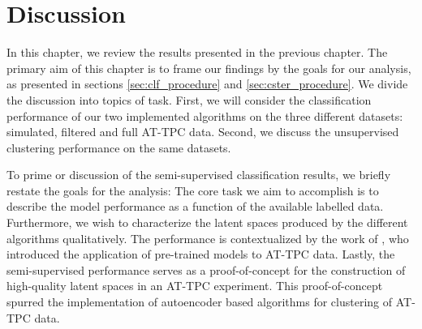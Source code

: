\chapter{Discussion}
In this chapter, we review the results presented in the previous chapter. The primary aim of this chapter is to frame our findings by the goals for our analysis, as presented in sections \ref{sec:clf_procedure} and \ref{sec:cster_procedure}. We divide the discussion into topics of task. First, we will consider the classification performance of our two implemented algorithms on the three different datasets: simulated, filtered and full AT-TPC data. Second, we discuss the unsupervised clustering performance on the same datasets. 

To prime or discussion of the semi-supervised classification results, we briefly restate the goals for the analysis: The core task we aim to accomplish is to describe the model performance as a function of the available labelled data. Furthermore, we wish to characterize the latent spaces produced by the different algorithms qualitatively. The performance is contextualized by the work of \citet{Kuchera2019}, who introduced the application of pre-trained models to AT-TPC data. Lastly, the semi-supervised performance serves as a proof-of-concept for the construction of high-quality latent spaces in an AT-TPC experiment. This proof-of-concept spurred the implementation of autoencoder based algorithms for clustering of AT-TPC data.